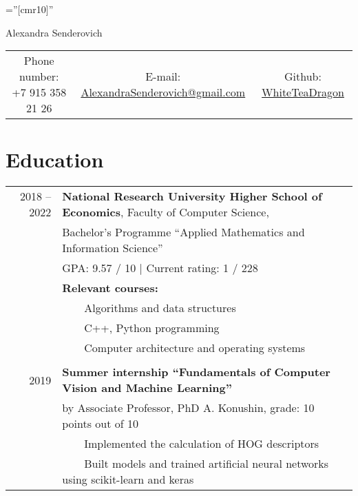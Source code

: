\documentclass[a4paper,10pt]{article}
\newcommand{\tabitem}{~~\llap{\textbullet}~~}
\begin{document}

\pagestyle{empty} %

\font\fb=''[cmr10]'' %

\par{\centering
		{\Huge Alexandra Senderovich
	}\bigskip\par}


\begin{center}
\begin{tabular}{c c c}
     Phone number: +7 915 358 21 26 & E-mail: \href{mailto:alexandrasenderovich@gmail.com}{AlexandraSenderovich@gmail.com} & Github: \href{https://github.com/WhiteTeaDragon}{WhiteTeaDragon}
\end{tabular}
\end{center}

\section{Education}
\begin{tabular}{rl}	
2018 -- 2022 & \textbf{National Research University Higher School of Economics}, Faculty of Computer Science, \\ & Bachelor’s Programme “Applied Mathematics and Information Science”\\
& GPA: 9.57 / 10 | Current rating: 1 / 228 \\
& \textbf{Relevant courses:}\\
& \tabitem Algorithms and data structures \\
& \tabitem C++, Python programming \\
& \tabitem Computer architecture and operating systems \\
& \\
2019 & \textbf{Summer internship “Fundamentals of Computer Vision and Machine Learning”} \\
& by Associate Professor, PhD A. Konushin, grade: 10 points out of 10 \\
& \tabitem Implemented the calculation of HOG descriptors \\
& \tabitem Built models and trained artificial neural networks using scikit-learn and keras 
\end{tabular}
\end{document}
